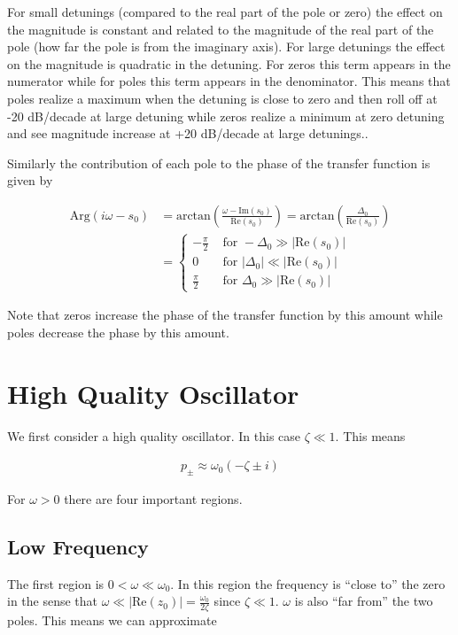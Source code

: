 \documentclass[12pt]{article}
\begin{document}
For small detunings (compared to the real part of the pole or zero) the effect on the magnitude is constant and related to the magnitude of the real part of the pole (how far the pole is from the imaginary axis). For large detunings the effect on the magnitude is quadratic in the detuning.
For zeros this term appears in the numerator while for poles this term appears in the denominator. This means that poles realize a maximum when the detuning is close to zero and then roll off at -20 dB/decade at large detuning while zeros realize a minimum at zero detuning and see magnitude increase at +20 dB/decade at large detunings..

Similarly the contribution of each pole to the phase of the transfer function is given by

\begin{align}
\text{Arg}(i\omega - s_0) &= \text{arctan}\left(\frac{\omega - \text{Im}(s_0)}{\text{Re}(s_0)} \right) = \text{arctan}\left(\frac{\Delta_0}{\text{Re}(s_0)} \right)\\
&= 
\begin{cases}
-\frac{\pi}{2} &\text{ for } -\Delta_0 \gg |\text{Re}(s_0)|\\
0 &\text{ for } |\Delta_0| \ll |\text{Re}(s_0)|\\
\frac{\pi}{2} &\text{ for } \Delta_0 \gg |\text{Re}(s_0)|
\end{cases}
\end{align}

Note that zeros increase the phase of the transfer function by this amount while poles decrease the phase by this amount.

\section{High Quality Oscillator}

We first consider a high quality oscillator. In this case $\zeta \ll 1$. This means

\begin{align}
p_{\pm} \approx \omega_0(-\zeta \pm i)
\end{align}

For $\omega>0$ there are four important regions. 

\subsection{Low Frequency}
The first region is $0<\omega \ll \omega_0$. In this region the frequency is ``close to'' the zero in the sense that $\omega \ll |\text{Re}(z_0)| = \frac{\omega_0}{2\zeta}$ since $\zeta \ll 1$. $\omega$ is also ``far from'' the two poles. This means we can approximate
\end{document}
